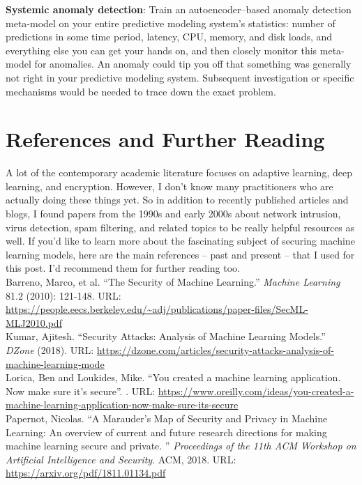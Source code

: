 \documentclass[fleqn]{article}
\begin{document}
\noindent\textbf{Systemic anomaly detection}: Train an autoencoder--based anomaly detection meta-model on your entire predictive modeling system's statistics: number of predictions in some time period, latency, CPU, memory, and disk loads, and everything else you can get your hands on, and then closely monitor this meta-model for anomalies. An anomaly could tip you off that something was generally not right in your predictive modeling system. Subsequent investigation or specific mechanisms would be needed to trace down the exact problem.\\

\section{References and Further Reading} \label{sec:ref}

A lot of the contemporary academic literature focuses on adaptive learning, deep learning, and encryption. However, I don't know many practitioners who are actually doing these things yet. So in addition to recently published articles and blogs, I found papers from the 1990s and early 2000s about network intrusion, virus detection, spam filtering, and related topics to be really helpful resources as well. If you'd like to learn more about the fascinating subject of securing machine learning models, here are the main references -- past and present -- that I used for this post. I'd recommend them for further reading too.\\

\noindent Barreno, Marco, et al. ``The Security of Machine Learning.'' \textit{Machine Learning} 81.2 (2010): 121-148. URL: \url{https://people.eecs.berkeley.edu/~adj/publications/paper-files/SecML-MLJ2010.pdf}\\

\noindent Kumar, Ajitesh. ``Security Attacks: Analysis of Machine Learning Models.'' \textit{DZone} (2018). URL: \url{https://dzone.com/articles/security-attacks-analysis-of-machine-learning-mode}\\

\noindent Lorica, Ben and Loukides, Mike. ``You created a machine learning application. Now make sure it’s secure''. . URL: \url{https://www.oreilly.com/ideas/you-created-a-machine-learning-application-now-make-sure-its-secure}\\

\noindent Papernot, Nicolas. ``A Marauder's Map of Security and Privacy in Machine Learning: An overview of current and future research directions for making machine learning secure and private. '' \textit{Proceedings of the 11th ACM Workshop on Artificial Intelligence and Security}. ACM, 2018. URL: \url{https://arxiv.org/pdf/1811.01134.pdf}
\end{document}
